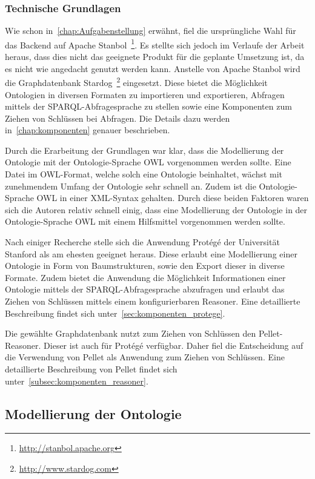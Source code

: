 \subsubsection{Technische Grundlagen}
Wie schon in~\autoref{chap:Aufgabenstellung} erwähnt, fiel die ursprüngliche Wahl für das Backend auf Apache Stanbol~\footnote{\url{http://stanbol.apache.org}}. Es stellte sich jedoch im Verlaufe der Arbeit heraus, dass dies nicht das geeignete Produkt für die geplante Umsetzung ist, da es nicht wie angedacht genutzt werden kann. Anstelle von Apache Stanbol wird die Graphdatenbank Stardog~\footnote{\url{http://www.stardog.com}} eingesetzt. Diese bietet die Möglichkeit Ontologien in diversen Formaten zu importieren und exportieren, Abfragen mittels der SPARQL-Abfragesprache zu stellen sowie eine Komponenten zum Ziehen von Schlüssen bei Abfragen. Die Details dazu werden in~\autoref{chap:komponenten} genauer beschrieben.

Durch die Erarbeitung der Grundlagen war klar, dass die Modellierung der Ontologie mit der Ontologie-Sprache OWL vorgenommen werden sollte. Eine Datei im OWL-Format, welche solch eine Ontologie beinhaltet, wächst mit zunehmendem Umfang der Ontologie sehr schnell an. Zudem ist die Ontologie-Sprache OWL in einer XML-Syntax gehalten. Durch diese beiden Faktoren waren sich die Autoren relativ schnell einig, dass eine Modellierung der Ontologie in der Ontologie-Sprache OWL mit einem Hilfsmittel vorgenommen werden sollte.

Nach einiger Recherche stelle sich die Anwendung Protégé der Universität Stanford als am ehesten geeignet heraus. Diese erlaubt eine Modellierung einer Ontologie in Form von Baumstrukturen, sowie den Export dieser in diverse Formate. Zudem bietet die Anwendung die Möglichkeit Informationen einer Ontologie mittels der SPARQL-Abfragesprache abzufragen und erlaubt das Ziehen von Schlüssen mittels einem konfigurierbaren Reasoner. Eine detaillierte Beschreibung findet sich unter~\autoref{sec:komponenten_protege}.

Die gewählte Graphdatenbank nutzt zum Ziehen von Schlüssen den Pellet-Reasoner. Dieser ist auch für Protégé verfügbar. Daher fiel die Entscheidung auf die Verwendung von Pellet als Anwendung zum Ziehen von Schlüssen. Eine detaillierte Beschreibung von Pellet findet sich unter~\autoref{subsec:komponenten_reasoner}.


\newpage

\subsection{Modellierung der Ontologie}
\label{sub:modellierung_der_ontologie}

